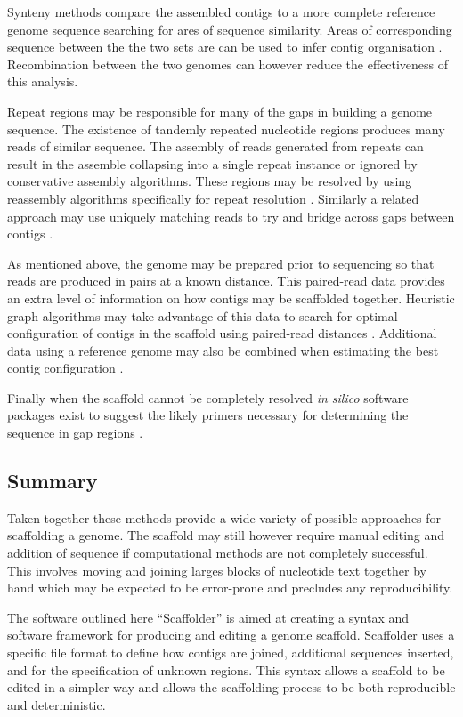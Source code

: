 \documentclass[10pt]{bmc_article}
\newenvironment{bmcformat}{\begin{raggedright}\baselineskip20pt\sloppy\setboolean{publ}{false}}{\end{raggedright}\baselineskip20pt\sloppy}
\begin{document}
\begin{bmcformat}
Synteny methods compare the assembled contigs to a more complete reference
genome sequence searching for ares of sequence similarity. Areas of
corresponding sequence between the the two sets are can be used to infer contig
organisation \cite{richter2007,zhao2008}. Recombination between the two genomes
can however reduce the effectiveness of this analysis. \pb

Repeat regions may be responsible for many of the gaps in building a genome
sequence. The existence of tandemly repeated nucleotide regions produces many
reads of similar sequence. The assembly of reads generated from repeats can
result in the assemble collapsing into a single repeat instance or ignored by
conservative assembly algorithms. These regions may be resolved by using
reassembly algorithms specifically for repeat resolution
\cite{mulyukov2002,koren2010}. Similarly a related approach may use uniquely
matching reads to try and bridge across gaps between contigs \cite{tsai2010}.
\pb

As mentioned above, the genome may be prepared prior to sequencing so that
reads are produced in pairs at a known distance. This paired-read data
provides an extra level of information on how contigs may be scaffolded
together. Heuristic graph algorithms may take advantage of this data to search
for optimal configuration of contigs in the scaffold using paired-read distances
\cite{dayarian2010}. Additional data using a reference genome may also be
combined when estimating the best contig configuration \cite{pop2004}. \pb

Finally when the scaffold cannot be completely resolved \emph{in silico}
software packages exist to suggest the likely primers necessary for determining
the sequence in gap regions \cite{gordon2001,nagarajan2010}. \pb

\subsection*{Summary} %

Taken together these methods provide a wide variety of possible approaches for
scaffolding a genome. The scaffold may still however require manual editing and
addition of sequence if computational methods are not completely successful.
This involves moving and joining larges blocks of nucleotide text together by
hand which may be expected to be error-prone and precludes any reproducibility.
\pb

The software outlined here ``Scaffolder'' is aimed at creating a syntax and
software framework for producing and editing a genome scaffold. Scaffolder uses
a specific file format to define how contigs are joined, additional sequences
inserted, and for the specification of unknown regions. This syntax allows
a scaffold to be edited in a simpler way and allows the scaffolding process to
be both reproducible and deterministic. \pb


\end{bmcformat}
\end{document}
